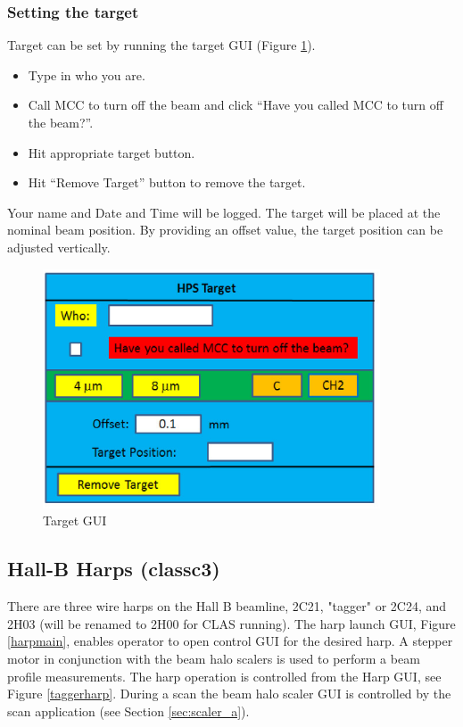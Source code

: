 \documentclass[12pt]{article}
\begin{document}
\subsubsection{\bf Setting the target}

Target can be set by running the target GUI (Figure \ref{targetgui}).

\begin{itemize}
\item
Type in who you are.
\item
Call MCC to turn off the beam and click ``Have you called MCC to turn off the beam?''.
\item
Hit appropriate target button.
\item 
Hit ``Remove Target'' button to remove the target.
\end{itemize}

Your name and Date and Time will be logged. The target will be placed at the nominal beam position. By providing an offset value, the target position can be adjusted vertically.

\begin{figure}[ht!]
\centering
\includegraphics[width=10cm]{targetgui.eps}
\caption{Target GUI}
\label{targetgui}
\end{figure}


\subsection{Hall-B Harps (classc3)\label{sec:harp}}

There are three wire harps on the Hall B beamline, 2C21, "tagger" or 2C24, and 2H03 (will be renamed to 2H00 for CLAS running). The harp launch GUI, Figure \ref{harpmain}, enables operator to open control GUI for the desired harp. A stepper motor in conjunction
with the beam halo scalers is used to perform a beam profile measurements. The harp operation is controlled from the Harp GUI, see Figure \ref{taggerharp}. During a scan the beam
halo scaler GUI is controlled by the scan application (see Section \ref{sec:scaler_a}).
\end{document}
